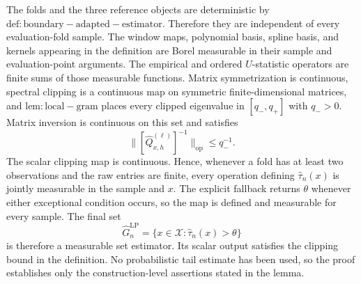 The folds and the three reference objects are deterministic by \(\mathrm{def:boundary-adapted-estimator}\). Therefore they are independent of every evaluation-fold sample. The window maps, polynomial basis, spline basis, and kernels appearing in the definition are Borel measurable in their sample and evaluation-point arguments. The empirical and ordered \(U\)-statistic operators are finite sums of those measurable functions. Matrix symmetrization is continuous, spectral clipping is a continuous map on symmetric finite-dimensional matrices, and \(\mathrm{lem:local-gram}\) places every clipped eigenvalue in \([q_-,q_+]\) with \(q_->0\). Matrix inversion is continuous on this set and satisfies
\[
\|[\widehat Q^{(\ell)}_{x,h}]^{-1}\|_{\mathrm{op}}\le q_-^{-1}.
\]
The scalar clipping map is continuous. Hence, whenever a fold has at least two observations and the raw entries are finite, every operation defining \(\widehat\tau_n(x)\) is jointly measurable in the sample and \(x\). The explicit fallback returns \(\theta\) whenever either exceptional condition occurs, so the map is defined and measurable for every sample. The final set
\[
\widehat G_n^{\mathrm{LP}}=\{x\in\mathcal X:\widehat\tau_n(x)>\theta\}
\]
is therefore a measurable set estimator. Its scalar output satisfies the clipping bound in the definition. No probabilistic tail estimate has been used, so the proof establishes only the construction-level assertions stated in the lemma.